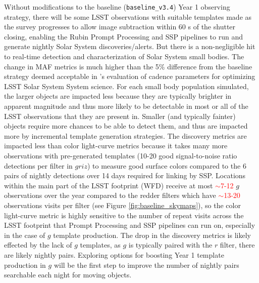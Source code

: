 \documentclass[preprint,linenumbers]{aastex631}
\newcommand{\baseline}{\texttt{baseline\_v3.4}\xspace}
\providecommand{\red}[1]{\textcolor{red}{#1}}
\begin{document}
{		Without modifications to the baseline (\baseline) Year 1 observing strategy, there will be some LSST observations with suitable templates made as the survey progresses to allow image subtraction within 60 s of the shutter closing, enabling the Rubin Prompt Processing and SSP pipelines to run and generate nightly Solar System discoveries/alerts. But there is a non-negligible hit to real-time detection and characterization of Solar System small bodies. The change in MAF metrics is much higher than the 5$\%$ difference from the baseline strategy deemed acceptable in \cite{schwambTuningLegacySurvey2023}'s evaluation of cadence parameters for optimizing LSST Solar System System science. For each small body population simulated, the larger objects are impacted less because they are typically brighter in apparent magnitude and thus more likely to be detectable in most or all of the LSST observations that they are present in. Smaller (and typically fainter) objects require more chances to be able to detect them, and thus are impacted more by incremental template generation strategies. 
		The discovery metrics are impacted less than color light-curve metrics because it takes many more observations with pre-generated templates (10-20 good signal-to-noise ratio detections per filter in $griz$) to measure good surface colors compared to the 6 pairs of nightly detections over 14 days required for linking by SSP. 
		Locations within the main part of the LSST footprint (WFD) receive at most \red{$\sim$7-12} $g$ observations over the year compared to the redder filters which have \red{$\sim$13-20} observations visits per filter (see Figure \ref{fig:baseline_skymaps}), so the color light-curve metric is highly sensitive to the number of repeat visits across the LSST footprint that Prompt Processing and SSP pipelines can run on, especially in the case of $g$ template production. 
		The drop in the discovery metrics is likely effected by the lack of $g$ templates, as $g$ is typically paired with the $r$ filter, there are likely nightly pairs. 
		Exploring options for boosting Year 1 template production in $g$ will be the first step to improve the number of nightly pairs searchable each night for moving objects. 
		
}
\end{document}

